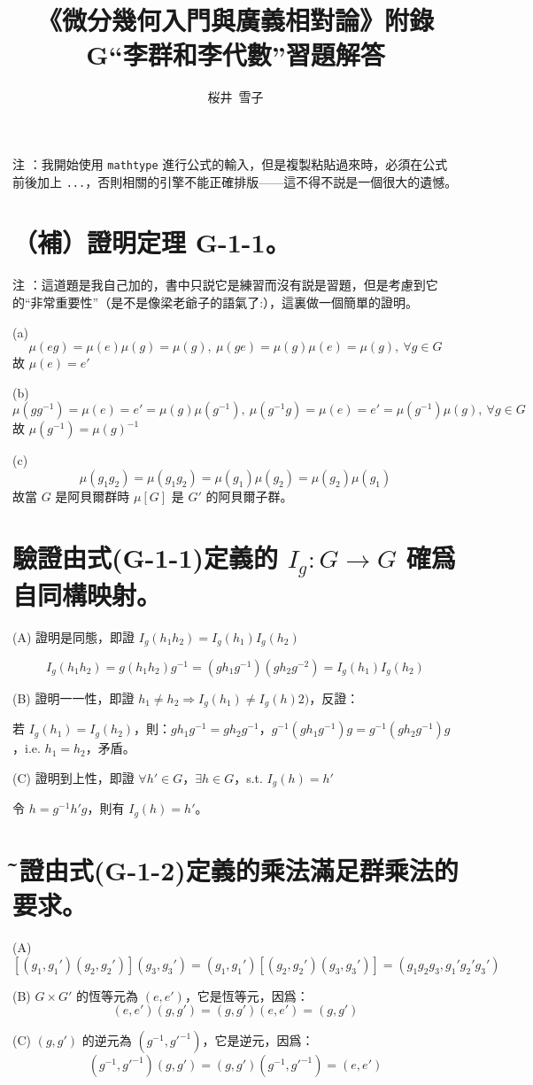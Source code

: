 \documentclass{article}
\title{《微分幾何入門與廣義相對論》附錄G“李群和李代數”習題解答}
\author{桜井\ 雪子}
\date{}
\begin{document}
\maketitle

注 ：我開始使用 \texttt{mathtype} 進行公式的輸入，但是複製粘貼過來時，必須在公式前後加上 \texttt{...}，否則相關的引擎不能正確排版——這不得不説是一個很大的遺憾。

\setcounter{section}{-1}
\section{（補）證明定理 G-1-1。}
\begin{framed}
  注 ：這道題是我自己加的，書中只説它是練習而沒有説是習題，但是考慮到它的“非常重要性”（是不是像梁老爺子的語氣了:），這裏做一個簡單的證明。

  (a)
  $$
    \mu(eg)=\mu(e)\mu(g)=\mu(g),\ \mu(ge)=\mu(g)\mu(e)=\mu(g),\ \forall g\in G
  $$
  故 $\mu(e)=e'$

  (b)
  $$
    \mu(gg^{-1})=\mu(e)=e'=\mu(g)\mu(g^{-1}),\ \mu(g^{-1}g)=\mu(e)=e'=\mu(g^{-1})\mu(g),\ \forall g\in G
  $$
  故 $\mu(g^{-1})=\mu(g)^{-1}$

  (c)
  $$
    \mu(g_1g_2)=\mu(g_1g_2)=\mu(g_1)\mu(g_2)=\mu(g_2)\mu(g_1)
  $$
  故當 $G$ 是阿貝爾群時 $\mu[G]$ 是 $G'$ 的阿貝爾子群。
\end{framed}

\section{驗證由式(G-1-1)定義的 $I_g:G\to G$ 確爲自同構映射。}
\begin{framed}
  (A) 證明是同態，即證 $I_g(h_1h_2)=I_g(h_1)I_g(h_2)$

  $$
    I_g(h_1h_2)=g(h_1h_2)g^{-1}=(gh_1g^{-1})(gh_2g^{-2})=I_g(h_1)I_g(h_2)
  $$

  (B) 證明一一性，即證 $h_1\neq h_2\Rightarrow I_g(h_1)\neq I_g(h)2)$，反證：

  若 $I_g(h_1)=I_g(h_2)$，則：$gh_1g^{-1}=gh_2g^{-1}$，$g^{-1}(gh_1g^{-1})g=g^{-1}(gh_2g^{-1})g$，i.e. $h_1=h_2$，矛盾。

  (C) 證明到上性，即證 $\forall h'\in G$，$\exists h\in G$，s.t. $I_g(h)=h'$

  令 $h=g^{-1}h'g$，則有 $I_g(h)=h'$。
\end{framed}

\section{\~ 驗證由式(G-1-2)定義的乘法滿足群乘法的要求。}
\begin{framed}
  (A)
  $$
    [(g_1,g_1')(g_2,g_2')](g_3,g_3')=(g_1,g_1')[(g_2,g_2')(g_3,g_3')]=(g_1g_2g_3,g_1'g_2'g_3')
  $$

  (B) $G\times G'$ 的恆等元為 $(e,e')$，它是恆等元，因爲：
  $$
    (e,e')(g,g')=(g,g')(e,e')=(g,g')
  $$

  (C) $(g,g')$ 的逆元為 $(g^{-1},g'^{-1})$，它是逆元，因爲：
  $$
    (g^{-1},g'^{-1})(g,g')=(g,g')(g^{-1},g'^{-1})=(e,e')
  $$
\end{framed}
\end{document}
